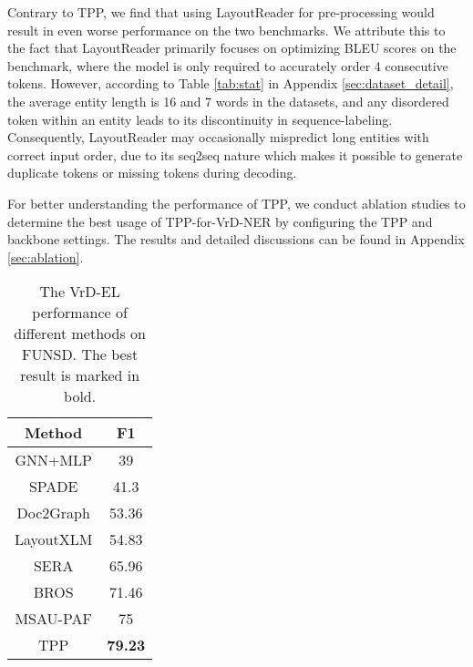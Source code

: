 \documentclass[11pt]{article}
\begin{document}
Contrary to TPP, we find that using LayoutReader for pre-processing would result in even worse performance on the two benchmarks.  We attribute this to the fact that LayoutReader primarily focuses on optimizing BLEU scores on the benchmark, where the model is only required to accurately order 4 consecutive tokens. However, according to Table \ref{tab:stat} in Appendix \ref{sec:dataset_detail}, the average entity length is 16 and 7 words in the datasets, and any disordered token within an entity leads to its discontinuity in sequence-labeling. Consequently, LayoutReader may occasionally mispredict long entities with correct input order, due to its seq2seq nature which makes it possible to generate duplicate tokens or missing tokens during decoding.

For better understanding the performance of TPP, we conduct ablation studies to determine the best usage of TPP-for-VrD-NER by configuring the TPP and backbone settings. 
The results and detailed discussions can be found in Appendix \ref{sec:ablation}. 

\renewcommand\tabcolsep{5pt}
\begin{table}[t]
\centering
\small
\begin{spacing}{1.19}
\begin{tabular}{c|c}
    \bottomrule
    \textbf{Method} & \textbf{F1} \\
    \hline
    GNN+MLP \citep{carbonell2021named} & 39 \\
    SPADE \citep{hwang2021spatial} & 41.3 \\
    Doc2Graph \citep{gemelli2022doc2graph} & 53.36 \\
    LayoutXLM \citep{xu2021layoutxlm} & 54.83 \\
    SERA \citep{zhang2021entity} & 65.96 \\
    BROS \citep{hong2022bros} & 71.46 \\
    MSAU-PAF \citep{dang2021end} & 75 \\
    \hline
    TPP & \textbf{79.23} \\
    \toprule
\end{tabular}
\end{spacing}
\caption{The VrD-EL performance of different methods on FUNSD. The best result is marked in bold.}
\vspace{-4mm}
\label{tab:re}
\end{table}
\end{document}
